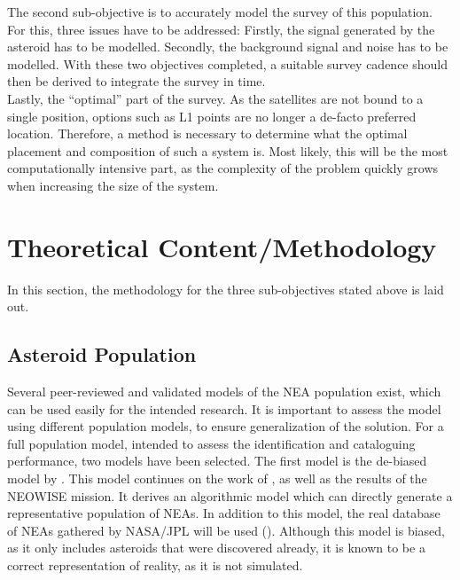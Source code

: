 \documentclass[12pt, english, NoHyper]{AE4010-template}
\begin{document}
The second sub-objective is to accurately model the survey of this population. For this, three issues have to be addressed: Firstly, the signal generated by the asteroid has to be modelled. Secondly, the background signal and noise has to be modelled. With these two objectives completed, a suitable survey cadence should then be derived to integrate the survey in time.\\

Lastly, the ``optimal'' part of the survey. As the satellites are not bound to a single position, options such as L1 points are no longer a de-facto preferred location. Therefore, a method is necessary to determine what the optimal placement and composition of such a system is. Most likely, this will be the most computationally intensive part, as the complexity of the problem quickly grows when increasing the size of the system.

\section{Theoretical Content/Methodology}
In this section, the methodology for the three sub-objectives stated above is laid out.

\subsection{Asteroid Population}
Several peer-reviewed and validated models of the NEA population exist, which can be used easily for the intended research. It is important to assess the model using different population models, to ensure generalization of the solution. For a full population model, intended to assess the identification and cataloguing performance, two models have been selected. The first model is the de-biased model by \cite{PopulationGranvik}. This model continues on the work of \cite{PopulationHarris}, as well as the results of the NEOWISE mission. It derives an algorithmic model which can directly generate a representative population of NEAs. In addition to this model, the real database of NEAs gathered by NASA/JPL will be used (\cite{CNEOSDatabase}). Although this model is biased, as it only includes asteroids that were discovered already, it is known to be a correct representation of reality, as it is not simulated.\\
\end{document}
